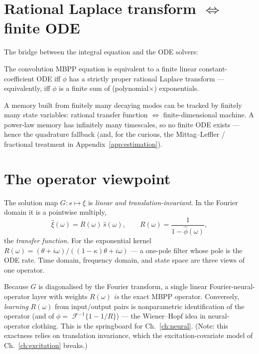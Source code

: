 \section{Rational Laplace transform $\Leftrightarrow$ finite ODE}

The bridge between the integral equation and the ODE solvers:

\begin{theorem}[realisation]\label{thm:ch11-rational}
The convolution MBPP equation is equivalent to a finite linear constant-coefficient
ODE iff $\phi$ has a strictly proper rational Laplace transform --- equivalently,
iff $\phi$ is a finite sum of (polynomial$\times$) exponentials.
\end{theorem}

\begin{intuitionbox}
A memory built from finitely many decaying modes can be tracked by finitely many
state variables: rational transfer function $\Leftrightarrow$ finite-dimensional
machine. A power-law memory has infinitely many timescales, so no finite ODE
exists --- hence the quadrature fallback (and, for the curious, the Mittag--Leffler
/ fractional treatment in Appendix~\ref{app:estimation}).
\end{intuitionbox}

\section{The operator viewpoint}

The solution map $G:s\mapsto\xi$ is \emph{linear and translation-invariant}. In
the Fourier domain it is a pointwise multiply,
\begin{equation}
\hat\xi(\omega)=R(\omega)\,\hat s(\omega),\qquad R(\omega)=\frac{1}{1-\hat\phi(\omega)},
\end{equation}
the \emph{transfer function}. For the exponential kernel
$R(\omega)=(\theta+i\omega)/((1-\kappa)\theta+i\omega)$ --- a one-pole filter whose
pole is the ODE rate. Time domain, frequency domain, and state space are three
views of one operator.

\begin{whybox}
Because $G$ is diagonalised by the Fourier transform, a single linear
Fourier-neural-operator layer with weights $R(\omega)$ \emph{is} the exact MBPP
operator. Conversely, \emph{learning} $R(\omega)$ from input/output pairs is
nonparametric identification of the operator (and of $\phi=$
$\mathcal F^{-1}\{1-1/R\}$) --- the Wiener--Hopf idea in neural-operator clothing.
This is the springboard for Ch.~\ref{ch:neural}. (Note: this exactness relies on
translation invariance, which the excitation-covariate model of
Ch.~\ref{ch:excitation} breaks.)
\end{whybox}

